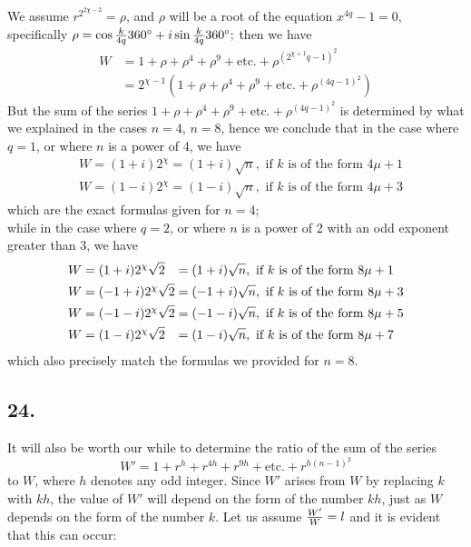\documentclass[twoside,12pt, showframe]{memoir}
\let\oldfrac\frac
\def\frac#1#2{\mathchoice{\tfrac{#1}{#2}}{\oldfrac{#1}{#2}}{\genfrac{}{}{}{2}{#1}{#2\mathstrut}}{\genfrac{}{}{}{3}{#1}{#2\mathstrut}}}
\begin{document}
We assume \(r^{2^{2 \chi-2}}=\rho\), and \(\rho\) will be a root of the equation \(x^{4 q}-1=0\), specifically \(\rho=\cos \frac{k}{4 q} 360^{\circ}+i \sin \frac{k}{4 q} 360^{\circ};\) then we have
\[\begin{aligned}
W & =1+\rho+\rho^{4}+\rho^{9}+\text{etc.}+\rho^{(2^{\chi+1} q-1)^{2}} \\
& =2^{\chi-1}(1+\rho+\rho^{4}+\rho^{9}+\text{etc.}+\rho^{(4 q-1)^{2}})
\end{aligned}\]
But the sum of the series \(1+\rho+\rho^{4}+\rho^{9}+\text{etc.}+\rho^{(4 q-1)^{2}}\) is determined by what we explained in the cases \(n=4\), \(n=8\), hence we conclude that in the case where \(q=1\), or where \(n\) is a power of 4, we have
\[\begin{aligned}
& W=(1+i) 2^{\chi}=(1+i) \sqrt n, \text{ if } k \text{ is of the form } 4 \mu+1 \\
& W=(1-i) 2^{\chi}=(1-i) \sqrt n, \text{ if } k \text{ is of the form } 4 \mu+3
\end{aligned}\]
which are the exact formulas given for \(n=4\);\\
while in the case where \(q=2\), or where \(n\) is a power of 2 with an odd exponent greater than 3, we have
\[\begin{alignedat}[t]{2}
W&=(1+i) 2^{\chi} \sqrt 2&&=(1+i) \sqrt n, \text{ if } k \text{ is of the form } 8 \mu+1 \\
W&=(-1+i) 2^{\chi} \sqrt 2&&=(-1+i) \sqrt n, \text{ if } k \text{ is of the form } 8 \mu+3 \\
W&=(-1-i) 2^{\chi} \sqrt 2&&=(-1-i) \sqrt n, \text{ if } k \text{ is of the form } 8 \mu+5 \\
W&=(1-i) 2^{\chi} \sqrt 2&&=(1-i) \sqrt n, \text{ if } k \text{ is of the form } 8 \mu+7
\end{alignedat}\]
which also precisely match the formulas we provided for \(n=8\).
%

\subsection*{24.}

It will also be worth our while to determine the ratio of the sum of the series
\[ W' = 1 + r^h + r^{4h} + r^{9h} + \text{etc.} + r^{h(n-1)^2} \]
to \(W\), where \(h\) denotes any odd integer. Since \(W'\) arises from \(W\) by replacing \(k\) with \(kh\), the value of \(W'\) will depend on the form of the number \(kh\), just as \(W\) depends on the form of the number \(k\). Let us assume \(\frac{W'}{W} = l\) and it is evident that this can occur:
\end{document}
